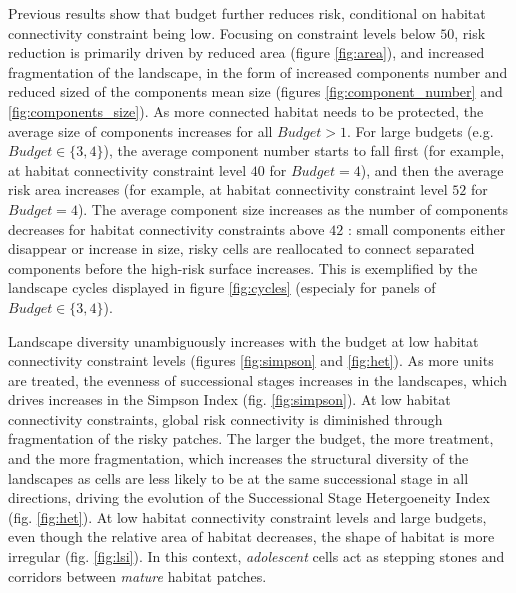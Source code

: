 Previous results show that budget further reduces risk, conditional on habitat connectivity constraint being low. Focusing on constraint levels below $50$,  risk reduction is primarily driven by reduced area (figure \ref{fig:area}), and increased fragmentation of the landscape, in the form of increased components number and reduced sized of the components mean size (figures \ref{fig:component_number} and \ref{fig:components_size}). As more connected habitat needs to be protected, the average size of components increases for all $Budget>1$. For large budgets (e.g. $Budget \in\{3,4\}$), the average component number starts to fall first (for example, at habitat connectivity constraint level $40$ for $Budget = 4$), and then the average risk area increases (for example, at habitat connectivity constraint level $52$ for $Budget=4$). The average component size increases as the number of components decreases for habitat connectivity constraints above $42$ : small components either disappear or increase in size, risky cells are reallocated to connect separated components before the high-risk surface increases. 
 This is exemplified by the landscape cycles displayed in figure \ref{fig:cycles} (especialy for panels of $Budget \in \{3,4\}$).


Landscape diversity unambiguously increases with the budget at low habitat connectivity constraint levels (figures \ref{fig:simpson} and \ref{fig:het}). As more units are treated, the evenness of successional stages increases in the landscapes, which drives increases in the Simpson Index (fig. \ref{fig:simpson}). At low habitat connectivity constraints, global risk connectivity is diminished through fragmentation of the risky patches. The larger the budget, the more treatment, and the more fragmentation, which increases the structural diversity of the landscapes as cells are less likely to be at the same successional stage in all directions, driving the evolution of the Successional Stage Hetergoeneity Index (fig. \ref{fig:het}).
At low habitat connectivity constraint levels and large budgets, even though the relative area of habitat decreases, the shape of habitat is more irregular (fig. \ref{fig:lsi}). In this context, \textit{adolescent} cells act as stepping stones and corridors between \textit{mature} habitat patches. 

